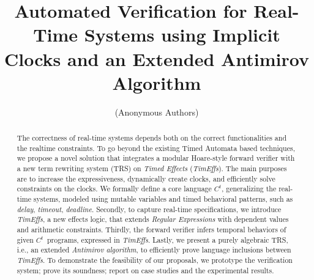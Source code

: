 \documentclass[acmsmall,10pt,review]{acmart}
\newcommand{\timedEffects}{\emph{TimEffs}}
\newcommand{\code}[1]{{\tt{\ensuremath{\m{#1}}}}}
\newcommand{\m}{\mathit}
\newcommand{\timedL}{\code{C^{t}}}
\begin{document}
\title{Automated Verification for Real-Time Systems 
using Implicit Clocks and an Extended Antimirov Algorithm}




\author{(Anonymous Authors)}






\begin{abstract} 
The correctness of real-time systems 
depends both on the correct functionalities and the realtime constraints.
To go beyond the existing Timed Automata based techniques, 
we propose a novel solution that integrates a 
modular Hoare-style forward verifier with a new term rewriting 
system (TRS) on \emph{Timed Effects} (\timedEffects).
The main purposes are to increase the expressiveness,  
dynamically create clocks, 
and efficiently solve constraints on the clocks.  
We formally define 
a core language \timedL, generalizing the real-time systems, modeled 
using mutable variables and timed behavioral patterns, 
such as \emph{delay}, \emph{timeout}, \emph{deadline}. 
Secondly, to capture real-time specifications, 
we introduce \timedEffects, a new effects logic, 
that extends 
\emph{Regular Expressions} with dependent
values and arithmetic constraints.
Thirdly,  the forward verifier infers temporal behaviors of given 
\timedL\ programs, expressed in \timedEffects. 
Lastly, we present a purely algebraic TRS, i.e., an extended \emph{Antimirov algorithm}, to 
efficiently prove language inclusions between 
 \timedEffects. 
To demonstrate the feasibility of our proposals, 
we prototype the verification system; prove its 
soundness; report on case studies and the experimental results. 

 



\end{abstract}
\end{document}
